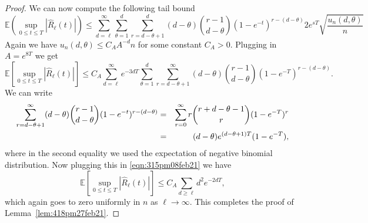 \documentclass[11pt]{article}
\begin{document}
\begin{proof}
We can now compute the following tail bound
\begin{equation*}
 \mathbb{E} \left( \sup_{0\leq t\leq T} \left| \widehat{R}_{\ell}(t)\right|\right) \leq \sum_{d= \ell}^{\infty}\sum_{\theta=1}^{d}\sum_{r=d-\theta+1}^{d}(d-\theta){r-1\choose d-\theta }(1-e^{-t})^{r-(d-\theta)} 2e^{sT}\sqrt{\frac{u_n(d,\theta)}{n}}
\end{equation*}
Again we have $u_n(d,\theta)\leq C_A A^{-d}n$ for some constant $C_A>0$. Plugging in $A=e^{8T}$ we get
\begin{equation}\label{eqn:315pm08feb21}
 \mathbb{E} \left[ \sup_{0\leq t\leq T} \left| \widehat{R}_{\ell}(t)\right|\right] \leq C_A\sum_{d=\ell}^{\infty}e^{-3dT}\sum_{\theta=1}^{d}\sum_{r=d-\theta+1}^{\infty}(d-\theta){r-1\choose d-\theta }(1-e^{-T})^{r-(d-\theta)}.
\end{equation}
We can write 
\begin{eqnarray}\label{eqn:314pm08feb21}
    \sum_{r=d-\theta+1}^{\infty}(d-\theta){r-1\choose d-\theta }(1-e^{-t})^{r-(d-\theta)} &=& \sum_{r=0}^{\infty} r {r +d-\theta-1\choose r}(1-e^{-T})^{r} \notag\\
    &=& (d-\theta)e^{(d-\theta+1)T}(1-e^{-T}),
\end{eqnarray}
where in the second equality we used the expectation of negative binomial distribution. Now plugging this in \eqref{eqn:315pm08feb21} we have
\begin{equation*}\label{eqn:315pm08feb21ee}
 \mathbb{E} \left[ \sup_{0\leq t\leq T} \left| \widehat{R}_{\ell}(t)\right|\right] \leq C_A\sum_{d\geq \ell}d^2 e^{-2dT},
\end{equation*}
which again goes to zero uniformly in $n$ as $\ell\rightarrow \infty$. This completes the proof of Lemma~\ref{lem:418pm27feb21}.
\end{proof}


\end{document}
